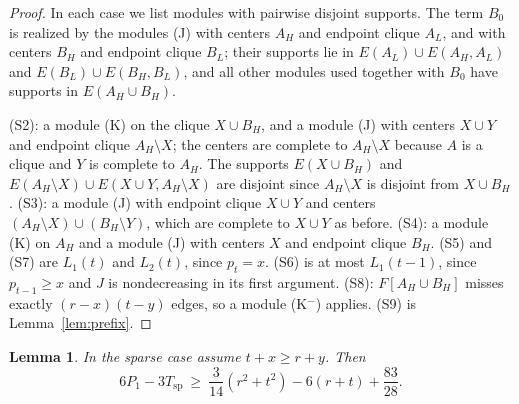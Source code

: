 \documentclass{amsart}
\newtheorem{lemma}[theorem]{Lemma}
\theoremstyle{definition}
\theoremstyle{remark}
\numberwithin{equation}{section}
\numberwithin{table}{section}
\begin{document}
\begin{proof}
In each case we list modules with pairwise disjoint supports. The term $B_0$ is realized by the modules (J) with centers $A_H$ and endpoint clique $A_L$, and with centers $B_H$ and endpoint clique $B_L$; their supports lie in $E(A_L)\cup E(A_H,A_L)$ and $E(B_L)\cup E(B_H,B_L)$, and all other modules used together with $B_0$ have supports in $E(A_H\cup B_H)$.

(S2): a module (K) on the clique $X\cup B_H$, and a module (J) with centers $X\cup Y$ and endpoint clique $A_H\setminus X$; the centers are complete to $A_H\setminus X$ because $A$ is a clique and $Y$ is complete to $A_H$. The supports $E(X\cup B_H)$ and $E(A_H\setminus X)\cup E(X\cup Y,A_H\setminus X)$ are disjoint since $A_H\setminus X$ is disjoint from $X\cup B_H$. (S3): a module (J) with endpoint clique $X\cup Y$ and centers $(A_H\setminus X)\cup(B_H\setminus Y)$, which are complete to $X\cup Y$ as before. (S4): a module (K) on $A_H$ and a module (J) with centers $X$ and endpoint clique $B_H$. (S5) and (S7) are $L_1(t)$ and $L_2(t)$, since $p_t=x$. (S6) is at most $L_1(t-1)$, since $p_{t-1}\ge x$ and $J$ is nondecreasing in its first argument. (S8): $F[A_H\cup B_H]$ misses exactly $(r-x)(t-y)$ edges, so a module (K$^-$) applies. (S9) is Lemma~\ref{lem:prefix}.
\end{proof}

\begin{lemma}\label{lem:sparseineq}
In the sparse case assume $t+x\ge r+y$. Then
\begin{equation}\label{eq:sparseineq}
6P_1-3T_{\mathrm{sp}}\ \ge\ \frac3{14}(r^2+t^2)-6(r+t)+\frac{83}{28}.
\end{equation}
\end{lemma}
\end{document}
